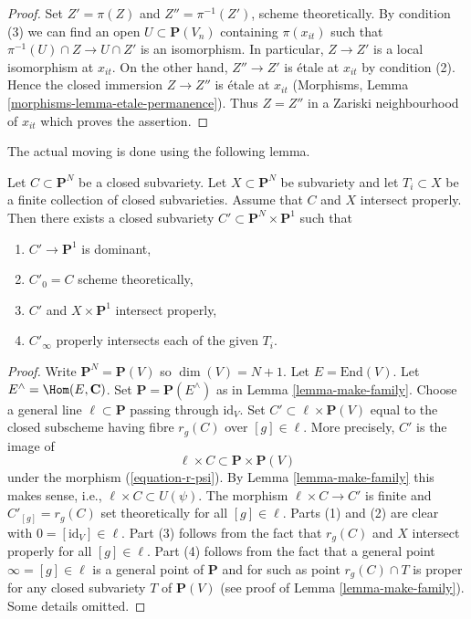 \begin{proof}
\medskip\noindent
Set $Z' = \pi(Z)$ and $Z'' = \pi^{-1}(Z')$, scheme theoretically. By
condition (3) we can find an open $U \subset \mathbf{P}(V_n)$ containing
$\pi(x_{it})$ such that $\pi^{-1}(U) \cap Z \to U \cap Z'$ is an isomorphism.
In particular, $Z \to Z'$ is a local isomorphism at $x_{it}$.
On the other hand, $Z'' \to Z'$ is \'etale at $x_{it}$ by condition (2).
Hence the closed immersion $Z \to Z''$ is \'etale at $x_{it}$
(Morphisms, Lemma \ref{morphisms-lemma-etale-permanence}).
Thus $Z = Z''$ in a Zariski neighbourhood of $x_{it}$ which proves
the assertion.
\end{proof}

\noindent
The actual moving is done using the following lemma.

\begin{lemma}
\label{lemma-move}
Let $C \subset \mathbf{P}^N$ be a closed subvariety.
Let $X \subset \mathbf{P}^N$ be subvariety and let $T_i \subset X$
be a finite collection of closed subvarieties.
Assume that $C$ and $X$ intersect properly.
Then there exists a closed subvariety
$C' \subset \mathbf{P}^N \times \mathbf{P}^1$ such that
\begin{enumerate}
\item $C' \to \mathbf{P}^1$ is dominant,
\item $C'_0 = C$ scheme theoretically,
\item $C'$ and $X \times \mathbf{P}^1$ intersect properly,
\item $C'_\infty$ properly intersects each of the given $T_i$.
\end{enumerate}
\end{lemma}

\begin{proof}
Write $\mathbf{P}^N = \mathbf{P}(V)$ so $\dim(V) = N + 1$. Let
$E = \text{End}(V)$. Let $E^\wedge = \Hom(E, \mathbf{C})$. Set
$\mathbf{P} = \mathbf{P}(E^\wedge)$ as in Lemma \ref{lemma-make-family}.
Choose a general line $\ell \subset \mathbf{P}$ passing through $\text{id}_V$.
Set $C' \subset \ell \times \mathbf{P}(V)$ equal to the
closed subscheme having fibre $r_g(C)$ over $[g] \in \ell$.
More precisely, $C'$ is the image of
$$
\ell \times C \subset \mathbf{P} \times \mathbf{P}(V)
$$
under the morphism (\ref{equation-r-psi}). By Lemma \ref{lemma-make-family}
this makes sense, i.e., $\ell \times C \subset U(\psi)$. The morphism
$\ell \times C \to C'$ is finite and $C'_{[g]} = r_g(C)$ set theoretically
for all $[g] \in \ell$. Parts (1) and (2) are clear with
$0 = [\text{id}_V] \in \ell$. Part (3) follows from the fact
that $r_g(C)$ and $X$ intersect properly for all $[g] \in \ell$.
Part (4) follows from the fact that a general point $\infty = [g] \in \ell$
is a general point of $\mathbf{P}$ and for such as point
$r_g(C) \cap T$ is proper for any closed subvariety $T$ of $\mathbf{P}(V)$
(see proof of Lemma \ref{lemma-make-family}).
Some details omitted.
\end{proof}

